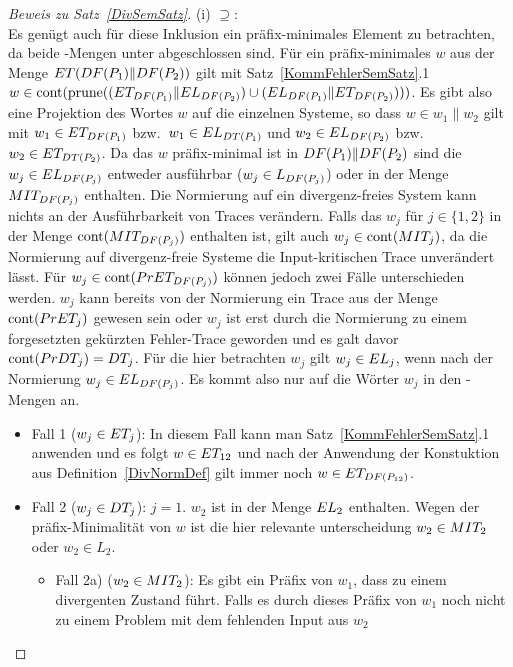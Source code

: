 \begin{proof}[Beweis zu Satz~\ref{DivSemSatz}]
  (i) \glqq $\supseteq$\grqq{}:\\
  Es genügt auch für diese Inklusion ein präfix-minimales Element zu
  betrachten, da beide \ET{}-Mengen unter \cont{} abgeschlossen sind. Für ein
  präfix-minimales $w$ aus der Menge $ET (DF (P_1)\|DF (P_2))$ gilt mit
  Satz~\ref{KommFehlerSemSatz}.1 $w\in \mathrm{cont} (\mathrm{prune} ((ET _{DF (P_1)}\|EL
  _{DF (P_2)})\cup (EL _{DF (P_1)}\|ET _{DF (P_2)})))$. Es gibt also
  eine Projektion des Wortes $w$ auf die einzelnen Systeme, so dass $w\in w_1\|
  w_2$ gilt mit $w_1\in ET _{DF (P_1)}$ bzw.\ $w_1\in EL _{DT (P_1)}$ und
  $w_2\in EL _{DF (P_2)}$ bzw.\ $w_2\in ET _{DT (P_2)}$. Da das $w$
  präfix-minimal ist in $DF (P_1)\|DF (P_2)$ sind die $w_j\in EL _{DF
  (P_j)}$ entweder ausführbar ($w_j\in L _{DF (P_j)}$) oder in der Menge $MIT
  _{DF (P_j)}$ enthalten. Die Normierung auf ein divergenz-freies System kann
  nichts an der Ausführbarkeit von Traces verändern. Falls das $w_j$ für
  $j\in\{1,2\}$ in der Menge $\mathrm{cont} (MIT _{DF (P_j)})$ enthalten ist, gilt
  auch $w_j\in\mathrm{cont} (MIT _j)$, da die Normierung auf divergenz-freie Systeme
  die Input-kritischen Trace unverändert lässt. Für $w_j\in\mathrm{cont} (PrET _{DF
  (P_j)})$ können jedoch zwei Fälle unterschieden werden. $w_j$ kann bereits
  von der Normierung ein Trace aus der Menge $\mathrm{cont} (PrET _j)$ gewesen sein
  oder $w_j$ ist erst durch die Normierung zu einem forgesetzten gekürzten
  Fehler-Trace geworden und es galt davor $\mathrm{cont} (PrDT _j) = DT _j$. Für die
  hier betrachten $w_j$ gilt $w_j\in EL _j$, wenn nach der Normierung
  $w_j\in EL _{DF (P_j)}$. Es kommt also nur auf die Wörter $w_j$ in den
  \ET{}-Mengen an.
  \begin{itemize}
    \item Fall 1 ($w_j\in ET _j$): In diesem Fall kann man
      Satz~\ref{KommFehlerSemSatz}.1 anwenden und es folgt $w\in ET _{12}$ und
      nach der Anwendung der Konstuktion aus Definition~\ref{DivNormDef} gilt
      immer noch $w\in ET _{DF (P_{12})}$.
    \item Fall 2 ($w_j\in DT _j$): \OBdA{} $j=1$. $w_2$ ist in der Menge $EL
      _2$ enthalten. Wegen der präfix-Minimalität von $w$ ist die hier
      relevante unterscheidung $w_2\in MIT _2$ oder $w_2\in L_2$.
      \begin{itemize}
        \item Fall 2a) ($w_2\in MIT _2$): Es gibt ein Präfix von $w_1$, dass
          zu einem divergenten Zustand führt. Falls es durch dieses Präfix von
          $w_1$ noch nicht zu einem Problem mit dem fehlenden Input aus $w_2$

\end{itemize}
\end{itemize}
\end{proof}
